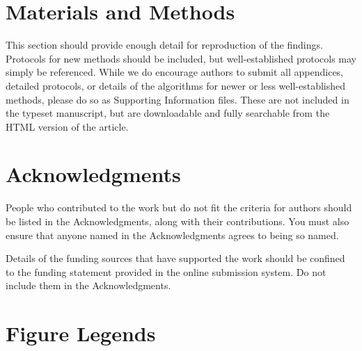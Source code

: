 \documentclass[10pt]{article}
\begin{document}
\section*{Materials and Methods}

This section should provide enough detail for reproduction of the findings. Protocols 
for new methods should be included, but well-established protocols may simply be referenced. While we do 
encourage authors to submit all appendices, detailed protocols, or details of the algorithms for newer or less 
well-established methods, please do so as Supporting Information files. These are not included in the typeset manuscript, 
but are downloadable and fully searchable from the HTML version of the article.

\section*{Acknowledgments}

People who contributed to the work but do not fit the criteria for authors should be listed in the 
Acknowledgments, along with their contributions. You must also ensure that anyone named in the Acknowledgments 
agrees to being so named.

Details of the funding sources that have supported the work should be confined to the funding statement 
provided in the online submission system. Do not include them in the Acknowledgments.



\section*{Figure Legends}
\end{document}
